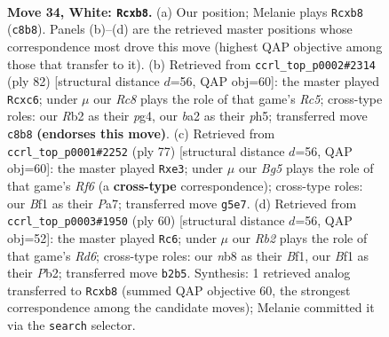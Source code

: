\documentclass[11pt]{article}
\begin{document}
\clearpage

\begin{figure}[p]\centering
\begin{subfigure}{0.46\textwidth}\centering
\resizebox{\linewidth}{!}{%
\newchessgame
\chessboard[
  setfen={rnR5/6k1/8/4p1Bp/4r3/5p1P/bR3P2/5BK1 w - - 0 34},
  showmover=false,
  pgfstyle=straightmove, color=movearrow, markmove={c8-b8}
]}
\caption{}
\end{subfigure}\hfill
\begin{subfigure}{0.46\textwidth}\centering
\resizebox{\linewidth}{!}{%
\newchessgame
\chessboard[
  setfen={2r5/4rpk1/1PnR4/2R4p/6p1/8/2P4P/2K5 w - - 0 42},
  showmover=false,
  pgfstyle=straightmove, color=movearrow, markmove={c5-c6}
]}
\caption{}
\end{subfigure}
\\[4pt]
\begin{subfigure}{0.46\textwidth}\centering
\resizebox{\linewidth}{!}{%
\newchessgame
\chessboard[
  setfen={8/p3kp2/8/8/1P4Rb/P3Pr2/3R4/2rN2K1 b - - 6 39},
  showmover=false,
  pgfstyle=straightmove, color=movearrow, markmove={f3-e3}
]}
\caption{}
\end{subfigure}\hfill
\begin{subfigure}{0.46\textwidth}\centering
\resizebox{\linewidth}{!}{%
\newchessgame
\chessboard[
  setfen={3b1r2/7k/3R4/1p1P1p2/5p1p/P4P2/KP6/4rB1R w - - 0 31},
  showmover=false,
  pgfstyle=straightmove, color=movearrow, markmove={d6-c6}
]}
\caption{}
\end{subfigure}
\caption{\textbf{Move 34, White: \texttt{Rcxb8}.} (a) Our position; Melanie plays \texttt{Rcxb8} (\texttt{c8b8}). Panels (b)--(d) are the retrieved master positions whose correspondence most drove this move (highest QAP objective among those that transfer to it). (b) Retrieved from \texttt{ccrl\_top\_p0002\#2314} (ply 82) [structural distance $d$=56, QAP obj=60]: the master played \texttt{Rcxc6}; under $\mu$ our \emph{Rc8} plays the role of that game's \emph{Rc5}; cross-type roles: our \emph{R}b2 as their \emph{p}g4, our \emph{b}a2 as their \emph{p}h5; transferred move \texttt{c8b8} \textbf{(endorses this move)}. (c) Retrieved from \texttt{ccrl\_top\_p0001\#2252} (ply 77) [structural distance $d$=56, QAP obj=60]: the master played \texttt{Rxe3}; under $\mu$ our \emph{Bg5} plays the role of that game's \emph{Rf6} (a \textbf{cross-type} correspondence); cross-type roles: our \emph{B}f1 as their \emph{P}a7; transferred move \texttt{g5e7}. (d) Retrieved from \texttt{ccrl\_top\_p0003\#1950} (ply 60) [structural distance $d$=56, QAP obj=52]: the master played \texttt{Rc6}; under $\mu$ our \emph{Rb2} plays the role of that game's \emph{Rd6}; cross-type roles: our \emph{n}b8 as their \emph{B}f1, our \emph{B}f1 as their \emph{P}b2; transferred move \texttt{b2b5}. Synthesis: 1 retrieved analog transferred to \texttt{Rcxb8} (summed QAP objective 60, the strongest correspondence among the candidate moves); Melanie committed it via the \texttt{search} selector.}
\label{fig:thought-m66}
\end{figure}
\end{document}
